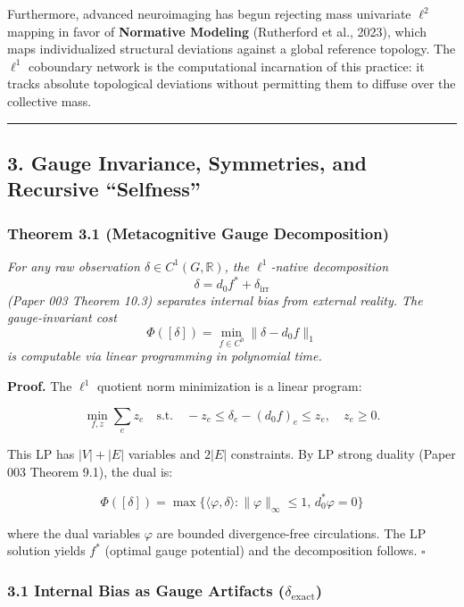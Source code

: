 \documentclass[
]{article}
\begin{document}
Furthermore, advanced neuroimaging has begun rejecting mass univariate
\(\ell^2\) mapping in favor of \textbf{Normative Modeling} (Rutherford
et al., 2023), which maps individualized structural deviations against a
global reference topology. The \(\ell^1\) coboundary network is the
computational incarnation of this practice: it tracks absolute
topological deviations without permitting them to diffuse over the
collective mass.

\begin{center}\rule{0.5\linewidth}{0.5pt}\end{center}

\subsection{3. Gauge Invariance, Symmetries, and Recursive
``Selfness''}\label{gauge-invariance-symmetries-and-recursive-selfness}

\subsubsection{Theorem 3.1 (Metacognitive Gauge
Decomposition)}\label{theorem-3.1-metacognitive-gauge-decomposition}

\emph{For any raw observation \(\delta \in C^1(G, \mathbb{R})\), the
\(\ell^1\)-native decomposition}
\[\delta = d_0 f^* + \delta_{\mathrm{irr}}\] \emph{(Paper 003 Theorem
10.3) separates internal bias from external reality. The gauge-invariant
cost} \[\Phi([\delta]) = \min_{f \in C^0} \|\delta - d_0 f\|_1\]
\emph{is computable via linear programming in polynomial time.}

\textbf{Proof.} The \(\ell^1\) quotient norm minimization is a linear
program:

\[\min_{f, z} \sum_e z_e \quad \text{s.t.} \quad -z_e \leq \delta_e - (d_0 f)_e \leq z_e, \quad z_e \geq 0.\]

This LP has \(|V| + |E|\) variables and \(2|E|\) constraints. By LP
strong duality (Paper 003 Theorem 9.1), the dual is:

\[\Phi([\delta]) = \max\{\langle \varphi, \delta \rangle : \|\varphi\|_\infty \leq 1, \, d_0^* \varphi = 0\}\]

where the dual variables \(\varphi\) are bounded divergence-free
circulations. The LP solution yields \(f^*\) (optimal gauge potential)
and the decomposition follows. \(\square\)

\subsubsection{\texorpdfstring{3.1 Internal Bias as Gauge Artifacts
(\(\delta_{\mathrm{exact}}\))}{3.1 Internal Bias as Gauge Artifacts (\textbackslash delta\_\{\textbackslash mathrm\{exact\}\})}}\label{internal-bias-as-gauge-artifacts-delta_mathrmexact}
\end{document}
